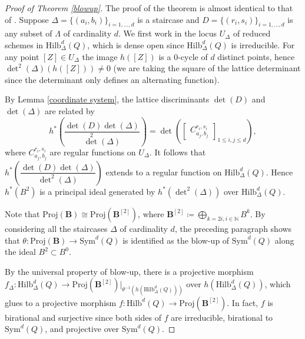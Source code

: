 \documentclass{amsart}[12pt]
\theoremstyle{definition}
\theoremstyle{remark}
\numberwithin{equation}{section}
\begin{document}
\begin{proof}[Proof of Theorem \ref{blowup}]
The proof of the theorem is almost identical to that of \cite[Proposition 2.6]{H98}. Suppose $\Delta = \{(a_i, b_i)\}_{i = 1, \dots, d}$ is a staircase and $D = \{(r_i, s_i)\}_{i = 1, \dots, d}$ is any subset of $\Lambda$ of cardinality $d$. We first work in the locus $U_{\Delta}$ of reduced schemes in $\mathrm{Hilb}^d_{\Delta}(Q)$, which is dense open since $\mathrm{Hilb}^d_{\Delta}(Q)$ is irreducible. For any point $[Z] \in U_{\Delta}$ the image $h([Z])$ is a 0-cycle of $d$ distinct points, hence $\det^2(\Delta)(h([Z])) \neq 0$ (we are taking the square of the lattice determinant since the determinant only defines an alternating function). 

By Lemma \ref{coordinate system}, the lattice discriminants $\det(D)$ and $\det(\Delta)$ are related by
\[
h^*\left(\dfrac{\det(D) \det(\Delta)}{\det^2(\Delta)}\right) = \det\left(\begin{bmatrix}C^{r_i, s_i}_{a_j, b_j}\end{bmatrix}_{1 \leq i, j \leq d}\right),
\]
where $C^{r_i, s_i}_{a_j, b_j}$ are regular functions on $U_{\Delta}$. It follows that $h^*\left(\dfrac{\det(D) \det(\Delta)}{\det^2(\Delta)}\right)$ extends to a regular function on $\mathrm{Hilb}^d_{\Delta}(Q)$. Hence $h^*(B^2)$ is a principal ideal generated by $h^*(\det^2(\Delta))$ over $\mathrm{Hilb}^d_{\Delta}(Q)$. 

Note that $\mathrm{Proj}(\mathbf{B}) \cong \mathrm{Proj}(\mathbf{B}^{[2]})$, where $\mathbf{B}^{[2]} \coloneqq \bigoplus_{k = 2i, i \in \mathbb{N}}B^{k}$. By considering all the staircases $\Delta$ of cardinality $d$, the preceding paragraph shows that $\theta: \mathrm{Proj}(\mathbf{B}) \to \mathrm{Sym}^d(Q)$ is identified as the blow-up of $\mathrm{Sym}^d(Q)$ along the ideal $B^2 \subset B^0$. 

By the universal property of blow-up, there is a projective morphism $f_{\Delta}: \mathrm{Hilb}^d_{\Delta}(Q) \to \mathrm{Proj}(\mathbf{B}^{[2]})|_{\theta^{-1}(h(\mathrm{Hilb}^d_{\Delta}(Q)))}$ over $h(\mathrm{Hilb}^d_{\Delta}(Q))$, which glues to a projective morphism $f: \mathrm{Hilb}^d(Q) \to \mathrm{Proj}(\mathbf{B}^{[2]})$. In fact, $f$ is birational and surjective since both sides of $f$ are irreducible, birational to $\mathrm{Sym}^d(Q)$, and projective over $\mathrm{Sym}^d(Q)$. 


\end{proof}
\end{document}
